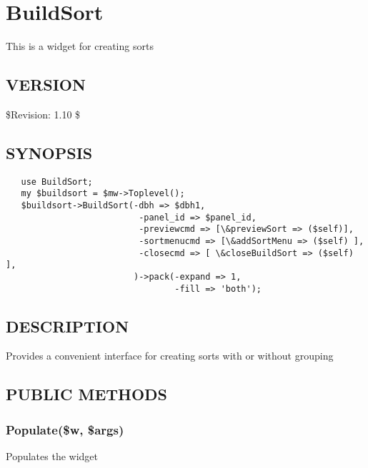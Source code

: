 \documentclass{article}
\begin{document}
\clearpage
\section{BuildSort\label{BuildSort}}


This is a widget for creating sorts

\subsection*{VERSION\label{BuildSort_VERSION}}


\$Revision: 1.10 \$

\subsection*{SYNOPSIS\label{BuildSort_SYNOPSIS}}
\begin{verbatim}
   use BuildSort;
   my $buildsort = $mw->Toplevel();
   $buildsort->BuildSort(-dbh => $dbh1,
                          -panel_id => $panel_id,
                          -previewcmd => [\&previewSort => ($self)],
                          -sortmenucmd => [\&addSortMenu => ($self) ],
                          -closecmd => [ \&closeBuildSort => ($self) ],
                         )->pack(-expand => 1,
                                 -fill => 'both');
\end{verbatim}
\subsection*{DESCRIPTION\label{BuildSort_DESCRIPTION}}


Provides a convenient interface for creating sorts with or without grouping

\subsection*{PUBLIC METHODS\label{BuildSort_PUBLIC_METHODS}}
\subsubsection*{Populate(\$w, \$args)\label{BuildSort_Populate_w_args_}}


Populates the widget
\end{document}

